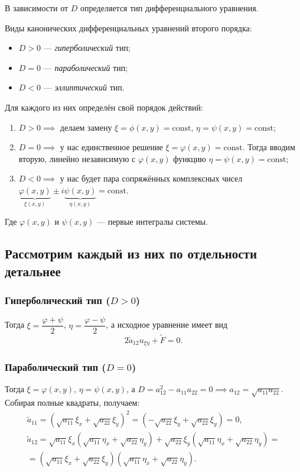 В зависимости от $D$ определяется тип дифференциального уравнения.

\begin{remark}
    Виды канонических дифференциальных уравнений второго порядка:
    \begin{itemize}
        \item $D > 0$ — \textit{гиперболический} тип;
        \item $D = 0$ — \textit{параболический} тип;
        \item $D < 0$ — \textit{эллиптический} тип.
    \end{itemize}
\end{remark}

Для каждого из них определён свой порядок действий:
\begin{enumerate}
    \item $D > 0 \implies$ делаем замену $\xi = \phi(x, y) = \text{const}$, $\eta = \psi(x, y) = \text{const}$;
    \item $D = 0 \implies$ у нас единственное решение $\xi = \varphi(x, y) = \text{const}$. Тогда вводим вторую, линейно независимую с $\varphi(x, y)$ функцию $\eta = \psi(x, y) = \text{const}$;
    \item $D < 0 \implies$ у нас будет пара сопряжённых комплексных чисел $\underbrace{\varphi(x, y)}_{\xi(x, y)} \pm i \underbrace{\psi(x, y)}_{\eta(x, y)} = \text{const}$.
\end{enumerate}

\begin{remark}
    Где $\varphi(x, y)$ и $\psi(x, y)$ — первые интегралы системы.
\end{remark}

\subsection*{Рассмотрим каждый из них по отдельности детальнее}

\subsubsection*{Гиперболический тип ($D > 0$)}
Тогда $\xi = \dfrac{\varphi + \psi}{2}$, $\eta = \dfrac{\varphi - \psi}{2}$, а исходное уравнение имеет вид
$$ 2 \tilde{a}_{12} u_{\xi \eta} + \tilde{F} = 0. $$

\subsubsection*{Параболический тип ($D = 0$)}
Тогда $\xi = \varphi(x, y)$, $\eta = \psi(x, y)$, а $D = a_{12}^2 - a_{11} a_{22} = 0 \implies a_{12} = \sqrt{a_{11} a_{22}}$. Собирая полные квадраты, получаем:
$$
\begin{matrix}
\tilde{a}_{11} = (\sqrt{a_{11}} \xi_x + \sqrt{a_{22}} \xi_y)^2 = (-\sqrt{a_{22}} \xi_y + \sqrt{a_{22}} \xi_y) = 0, \\
\tilde{a}_{12} = \sqrt{a_{11}} \xi_x (\sqrt{a_{11}} \eta_x + \sqrt{a_{22}} \eta_y) + \sqrt{a_{22}} \xi_y (\sqrt{a_{11}} \eta_x + \sqrt{a_{22}} \eta_y) = \\
= (\sqrt{a_{11}} \xi_x + \sqrt{a_{22}} \xi_y)(\sqrt{a_{11}} \eta_x + \sqrt{a_{22}} \eta_y).
\end{matrix}
$$


